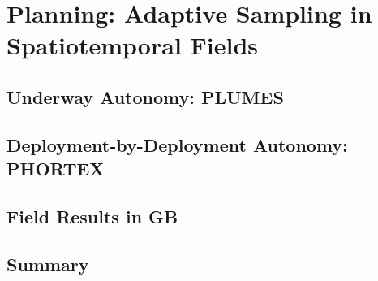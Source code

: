 \chapter{Planning: Adaptive Sampling in Spatiotemporal Fields}

\section{Underway Autonomy: PLUMES}

\section{Deployment-by-Deployment Autonomy: PHORTEX}

\section{Field Results in GB}

\section{Summary}
